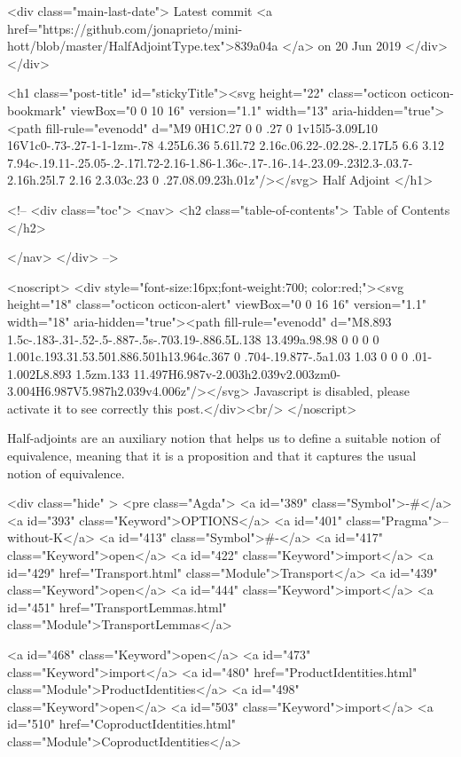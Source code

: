     <div class="main-last-date">
      Latest commit <a href="https://github.com/jonaprieto/mini-hott/blob/master/HalfAdjointType.tex">839a04a </a> on  20 Jun 2019
    </div>
  </div>
  
  <h1 class="post-title" id="stickyTitle"><svg height="22" class="octicon octicon-bookmark" viewBox="0 0 10 16" version="1.1" width="13" aria-hidden="true"><path fill-rule="evenodd" d="M9 0H1C.27 0 0 .27 0 1v15l5-3.09L10 16V1c0-.73-.27-1-1-1zm-.78 4.25L6.36 5.61l.72 2.16c.06.22-.02.28-.2.17L5 6.6 3.12 7.94c-.19.11-.25.05-.2-.17l.72-2.16-1.86-1.36c-.17-.16-.14-.23.09-.23l2.3-.03.7-2.16h.25l.7 2.16 2.3.03c.23 0 .27.08.09.23h.01z"/></svg> Half Adjoint
  </h1>

  <!-- 
  <div class="toc">
    <nav>
    <h2 class="table-of-contents"> Table of Contents </h2>
      

    </nav>
  </div>
   -->

  <noscript>
  <div style="font-size:16px;font-weight:700; color:red;"><svg height="18" class="octicon octicon-alert" viewBox="0 0 16 16" version="1.1" width="18" aria-hidden="true"><path fill-rule="evenodd" d="M8.893 1.5c-.183-.31-.52-.5-.887-.5s-.703.19-.886.5L.138 13.499a.98.98 0 0 0 0 1.001c.193.31.53.501.886.501h13.964c.367 0 .704-.19.877-.5a1.03 1.03 0 0 0 .01-1.002L8.893 1.5zm.133 11.497H6.987v-2.003h2.039v2.003zm0-3.004H6.987V5.987h2.039v4.006z"/></svg> Javascript is disabled, please activate it to see correctly this post.</div><br/>
  </noscript>

  Half-adjoints are an auxiliary notion that helps us to define a suitable notion
of equivalence, meaning that it is a proposition and that it captures the usual
notion of equivalence.

<div class="hide" >
<pre class="Agda">
<a id="389" class="Symbol">{-#</a> <a id="393" class="Keyword">OPTIONS</a> <a id="401" class="Pragma">--without-K</a> <a id="413" class="Symbol">#-}</a>
<a id="417" class="Keyword">open</a> <a id="422" class="Keyword">import</a> <a id="429" href="Transport.html" class="Module">Transport</a>
<a id="439" class="Keyword">open</a> <a id="444" class="Keyword">import</a> <a id="451" href="TransportLemmas.html" class="Module">TransportLemmas</a>

<a id="468" class="Keyword">open</a> <a id="473" class="Keyword">import</a> <a id="480" href="ProductIdentities.html" class="Module">ProductIdentities</a>
<a id="498" class="Keyword">open</a> <a id="503" class="Keyword">import</a> <a id="510" href="CoproductIdentities.html" class="Module">CoproductIdentities</a>

